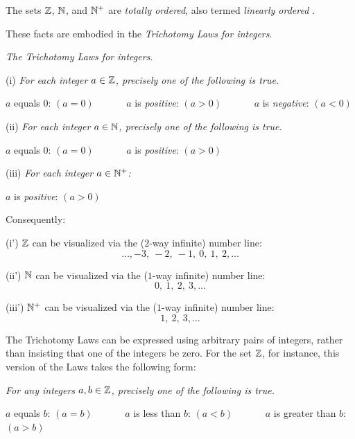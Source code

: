 
The sets $\mathbb{Z}$, $\mathbb{N}$, and $\mathbb{N}^+$ are {\em totally ordered},
also termed {\em linearly ordered}
.
\smallskip

These facts are embodied in the {\em Trichotomy Laws for integers}.
\medskip

{\it The Trichotomy Laws for integers}.
\smallskip

(i)
%
{\it For each integer $a \in \mathbb{Z}$, precisely one of the following is true.}

\hspace*{.2in} $a$ equals $0$: $(a=0)$ \ \ \ \ \ \
 $a$ is {\em positive}: $(a>0)$ \ \ \ \ \ \
 $a$ is {\em negative}: $(a<0)$
\smallskip

(ii)
%
{\it For each integer $a \in \mathbb{N}$, precisely one of the following is true.}

\hspace*{.2in} $a$ equals $0$: $(a=0)$ \ \ \ \ \ \
 $a$ is {\em positive}: $(a>0)$
\smallskip

(iii)
%
{\it For each integer $a \in \mathbb{N}^+$:}

\hspace*{.2in} $a$ is {\em positive}: $(a>0)$
\bigskip

Consequently:
\smallskip

(i')
$\mathbb{Z}$ can be visualized via the ($2$-way infinite) number line:
\[ \ldots, -3, \  -2, \ -1, \ 0, \ 1,\  2, \ldots \]
\smallskip

(ii')
$\mathbb{N}$ can be visualized via the ($1$-way infinite) number line:
\[  0, \ 1, \ 2, \ 3, \ldots \]
\smallskip

(iii')
$\mathbb{N}^+$ can be visualized via the ($1$-way infinite) number line:
\[  1, \ 2, \ 3, \ldots \]
\bigskip

The Trichotomy Laws can be expressed using arbitrary pairs of integers,
rather than insisting that one of the integers be zero.  For the set
$\mathbb{Z}$, for instance, this version of the Laws takes the following form:

{\it For any integers $a, b \in \mathbb{Z}$, precisely one of the following is
  true.}

\hspace*{.2in} $a$ equals $b$: $(a=b)$ \ \ \ \ \ \
 $a$ is less than $b$: $(a<b)$ \ \ \ \ \ \
 $a$ is greater than $b$: $(a>b)$

